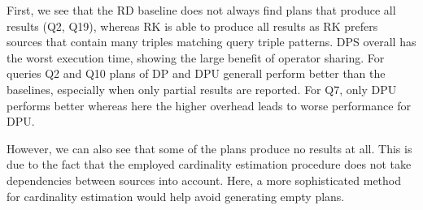 First, we see that the RD baseline does not always find plans that
produce all results (Q2, Q19), whereas RK is able to produce all
results as RK prefers sources that contain many triples matching query
triple patterns. DPS overall has the worst execution time, showing the
large benefit of operator sharing. For queries Q2 and Q10 plans of DP
and DPU generall perform better than the baselines, especially when
only partial results are reported. For Q7, only DPU performs better
whereas here the higher overhead leads to worse performance for DPU.



However, we can also see that some of the plans produce no results at
all. This is due to the fact that the employed cardinality estimation
procedure does not take dependencies between sources into
account. Here, a more sophisticated method for cardinality estimation
would help avoid generating empty plans.

